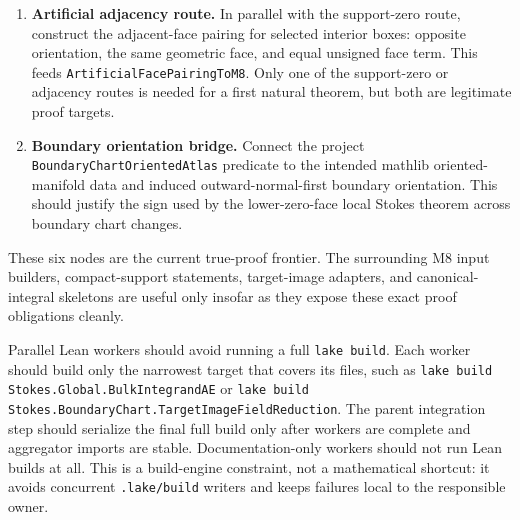 \begin{proposition}
\begin{enumerate}
    \item \textbf{Artificial adjacency route.}  In parallel with the
      support-zero route, construct the adjacent-face pairing for selected
      interior boxes: opposite orientation, the same geometric face, and equal
      unsigned face term.  This feeds \texttt{ArtificialFacePairingToM8}.  Only
      one of the support-zero or adjacency routes is needed for a first natural
      theorem, but both are legitimate proof targets.

    \item \textbf{Boundary orientation bridge.}  Connect the project
      \texttt{BoundaryChartOrientedAtlas} predicate to the intended mathlib
      oriented-manifold data and induced outward-normal-first boundary
      orientation.  This should justify the sign used by the lower-zero-face
      local Stokes theorem across boundary chart changes.
  \end{enumerate}

  These six nodes are the current true-proof frontier.  The surrounding M8
  input builders, compact-support statements, target-image adapters, and
  canonical-integral skeletons are useful only insofar as they expose these
  exact proof obligations cleanly.
  \par\endgroup
\end{proposition}

\begin{remark}
  \label{anc:m8_twelve_agent_focused_build_policy}
  \begingroup\raggedright
  Parallel Lean workers should avoid running a full \texttt{lake build}.  Each
  worker should build only the narrowest target that covers its files, such as
  \texttt{lake build Stokes.Global.BulkIntegrandAE} or
  \texttt{lake build Stokes.BoundaryChart.TargetImageFieldReduction}.  The
  parent integration step should serialize the final full build only after
  workers are complete and aggregator imports are stable.  Documentation-only
  workers should not run Lean builds at all.  This is a build-engine constraint,
  not a mathematical shortcut: it avoids concurrent \texttt{.lake/build}
  writers and keeps failures local to the responsible owner.
  \par\endgroup
\end{remark}

